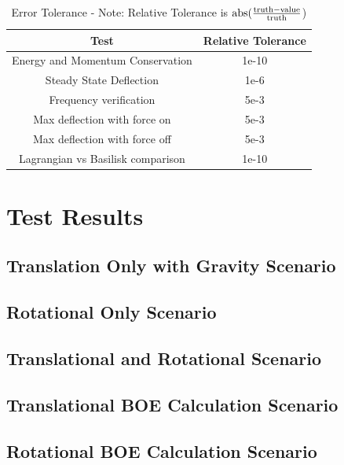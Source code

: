 \begin{table}[htbp]
	\caption{Error Tolerance - Note: Relative Tolerance is $\textnormal{abs}(\frac{\textnormal{truth} - \textnormal{value}}{\textnormal{truth}}$)}
	\label{tab:errortol}
	\centering \fontsize{10}{10}\selectfont
	\begin{tabular}{| c | c |} %
		\hline
		Test   & Relative Tolerance \\
		\hline
		Energy and Momentum Conservation & 1e-10 \\
		\hline
		Steady State Deflection & 1e-6 \\
		\hline
		Frequency verification & 5e-3 \\
		\hline
		Max deflection with force on & 5e-3 \\
		\hline
		Max deflection with force off & 5e-3 \\
		\hline
		Lagrangian vs Basilisk comparison & 1e-10 \\
		\hline	
	\end{tabular}
\end{table}

\clearpage

\section{Test Results}

\subsection{Translation Only with Gravity Scenario}


\clearpage

\subsection{Rotational Only Scenario}




\clearpage

\subsection{Translational and Rotational Scenario}




\clearpage

\subsection{Translational BOE Calculation Scenario}


\clearpage

\subsection{Rotational BOE Calculation Scenario}

\clearpage

